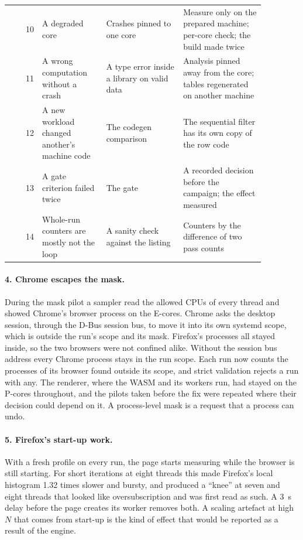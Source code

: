 \begin{table}[htbp]
\begin{tabular}{rp{0.25\linewidth}p{0.3\linewidth}p{0.32\linewidth}}
10 & A degraded core & Crashes pinned to one core & Measure only on the prepared machine; per-core check; the build made twice \\
11 & A wrong computation without a crash & A type error inside a library on valid data & Analysis pinned away from the core; tables regenerated on another machine \\
12 & A new workload changed another's machine code & The codegen comparison & The sequential filter has its own copy of the row code \\
13 & A gate criterion failed twice & The gate & A recorded decision before the campaign; the effect measured \\
14 & Whole-run counters are mostly not the loop & A sanity check against the listing & Counters by the difference of two pass counts \\
\bottomrule
\end{tabular}
\end{table}

\paragraph{4. Chrome escapes the mask.} During the mask pilot a sampler read
the allowed CPUs of every thread and showed Chrome's browser process on the
E-cores. Chrome asks the desktop session, through the D-Bus session bus, to
move it into its own systemd scope, which is outside the run's scope and
its mask. Firefox's processes all stayed inside, so the two browsers were
not confined alike. Without the session bus address every Chrome process
stays in the run scope. Each run now counts the processes of its browser
found outside its scope, and strict validation rejects a run with any. The
renderer, where the WASM and its workers run, had stayed on the P-cores
throughout, and the pilots taken before the fix were repeated where their
decision could depend on it. A process-level mask is a request that a
process can undo.

\paragraph{5. Firefox's start-up work.} With a fresh profile on every run,
the page starts measuring while the browser is still starting. For short
iterations at eight threads this made Firefox's local histogram 1.32 times
slower and bursty, and produced a ``knee'' at seven and eight threads that
looked like oversubscription and was first read as such. A 3~s delay before
the page creates its worker removes both. A scaling artefact at high $N$
that comes from start-up is the kind of effect that would be reported as a
result of the engine.

